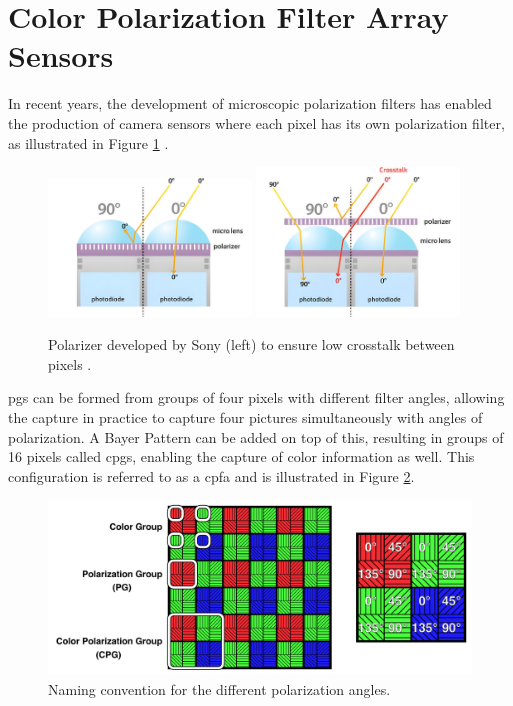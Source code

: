 \section{Color Polarization Filter Array Sensors}
In recent years, the development of microscopic polarization filters has enabled the production of camera sensors where each pixel has its own polarization filter, as illustrated in Figure \ref{fig:camera_crosstalk} \cite{lucidvisionlabsLUCIDGoingPolarizedWhitePaper2018}.
\begin{figure}[H]
    \centering
    \includegraphics[width=0.48\textwidth]{figures/crosstalk_off_upscaled.jpg}
    \includegraphics[width=0.48\textwidth]{figures/crosstalk_upscaled.jpg}
    \caption{Polarizer developed by Sony (left) to ensure low crosstalk between pixels \cite{lucidvisionlabsPolarizationExplainedSony2018}.}
    \label{fig:camera_crosstalk}
\end{figure}
\glspl{pg} can be formed from groups of four pixels with different filter angles, allowing the capture in practice to capture four pictures simultaneously with angles of polarization.
A Bayer Pattern can be added on top of this, resulting in groups of 16 pixels called \glspl{cpg}, enabling the capture of color information as well.
This configuration is referred to as a \gls{cpfa} and is illustrated in Figure \ref{fig:polarization_naming}.

\begin{figure}[H]
    \centering
    \includegraphics[width=\textwidth]{figures/polarized_image/naming.pdf}
    \caption{Naming convention for the different polarization angles.}
    \label{fig:polarization_naming}
\end{figure}

